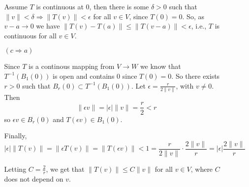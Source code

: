 \documentclass[11pt]{article}
\begin{document}
\begin{enumerate}
\begin{enumerate}
Assume $T$ is continuous at $0$, then there is some $\delta > 0$ such that $\|v\| < \delta \Rightarrow \|T(v)\| < \epsilon$ for all $v \in V$, since $T(0) = 0$.  So, as $v-a \rightarrow 0$ we have $\|T(v) - T(a)\| \leq \|T(v-a)\| < \epsilon$, i.e., $T$ is continuous for all $v \in V$.

\item[$(c \Rightarrow a)$]

Since $T$ is a continous mapping from $V \rightarrow W$ we know that $T^{-1}(B_1(0))$ is open and contains $0$ since $T(0) = 0$.  So there exists $r > 0$ such that $B_r(0) \subset T^{-1}(B_1(0))$.  Let $\epsilon = \frac{r}{2\|v\|}$, with $v \neq 0$.  Then
\[\|\epsilon v\| = |\epsilon|\|v\| = \frac{r}{2} < r\]
so $\epsilon v \in B_r(0)$ and $T(\epsilon v) \in B_1(0)$.

Finally,
\[ |\epsilon| \|T(v)\| = \|\epsilon T(v)\| = \|T(\epsilon v)\| < 1 = \frac{r}{2\|v\|} \cdot \frac{2 \|v\|}{r} = |\epsilon|\frac{2 \|v\|}{r} \]

Letting $C = \frac{2}{r}$, we get that $\|T(v)\| \leq C\|v\|$ for all $v \in V$, where $C$ does not depend on $v$.
\end{enumerate}
\end{enumerate}
\end{document}
